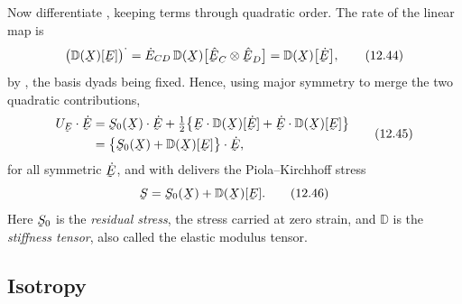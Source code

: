 Now differentiate , keeping terms through quadratic order.
The rate of the linear map is
\begin{equation}
   \big(\mathbb{D}(\bX)[\bE]\big)^{\textstyle\cdot}
   =\dot E_{CD}\,\mathbb{D}(\bX)\big[\hbE_{C}\otimes\hbE_{D}\big]
   =\mathbb{D}(\bX)\big[\dot\bE\big],
   \tag{12.44}\label{eq:12.44}
\end{equation}
by , the basis dyads being fixed. Hence, using major
symmetry to merge the two quadratic contributions,
\begin{equation}
\begin{aligned}
   U_{\bE}\cdot\dot\bE
   &=\bS_{0}(\bX)\cdot\dot\bE
   +\tfrac12\big\{\bE\cdot\mathbb{D}(\bX)[\dot\bE]
   +\dot\bE\cdot\mathbb{D}(\bX)[\bE]\big\}\\
   &=\big\{\bS_{0}(\bX)+\mathbb{D}(\bX)[\bE]\big\}\cdot\dot\bE ,
\end{aligned}
   \tag{12.45}\label{eq:12.45}
\end{equation}
for all symmetric $\dot\bE$, and  with  delivers
the Piola--Kirchhoff stress
\begin{equation}
   \bS=\bS_{0}(\bX)+\mathbb{D}(\bX)[\bE].
   \tag{12.46}\label{eq:12.46}
\end{equation}
Here $\bS_{0}$ is the \emph{residual stress}, the stress carried at zero
strain, and $\mathbb{D}$ is the \emph{stiffness tensor}, also called the
elastic modulus tensor.

\subsection*{Isotropy}

